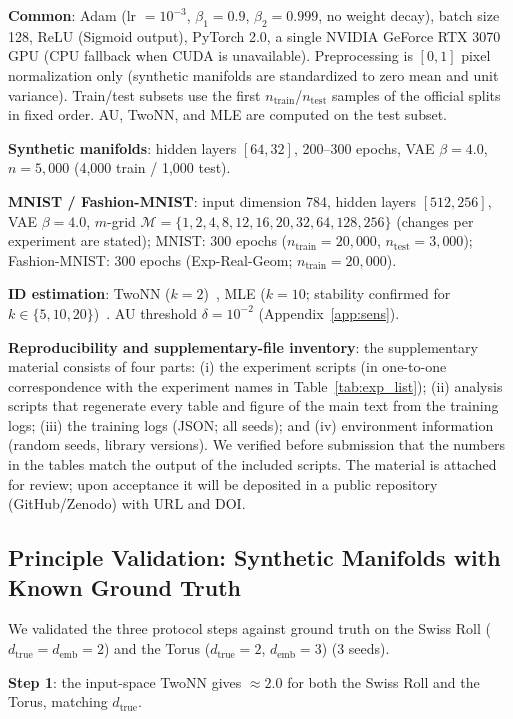\documentclass[make,article,submit,pdftex,moreauthors]{Definitions/mdpi}
\newcommand{\dtrue}{d_{\mathrm{true}}}
\newcommand{\demb}{d_{\mathrm{emb}}}
\begin{document}
\textbf{Common}: Adam (lr $= 10^{-3}$, $\beta_1 = 0.9$, $\beta_2 = 0.999$,
no weight decay), batch size 128, ReLU (Sigmoid output), PyTorch 2.0, a
single NVIDIA GeForce RTX 3070 GPU (CPU fallback when CUDA is unavailable).
Preprocessing is $[0,1]$ pixel normalization only (synthetic manifolds are
standardized to zero mean and unit variance).
Train/test subsets use the first $n_{\mathrm{train}}$/$n_{\mathrm{test}}$
samples of the official splits in fixed order.
AU, TwoNN, and MLE are computed on the test subset.

\textbf{Synthetic manifolds}: hidden layers $[64, 32]$, 200--300 epochs,
VAE $\beta = 4.0$, $n = 5{,}000$ (4{,}000 train / 1{,}000 test).

\textbf{MNIST / Fashion-MNIST}: input dimension 784, hidden layers
$[512, 256]$, VAE $\beta = 4.0$, $m$-grid
$\mathcal{M} = \{1, 2, 4, 8, 12, 16, 20, 32, 64, 128, 256\}$ (changes per
experiment are stated); MNIST: 300 epochs
($n_{\mathrm{train}} = 20{,}000$, $n_{\mathrm{test}} = 3{,}000$);
Fashion-MNIST: 300 epochs (Exp-Real-Geom; $n_{\mathrm{train}} = 20{,}000$).

\textbf{ID estimation}: TwoNN ($k = 2$)~\cite{facco2017twonn}, MLE
($k = 10$; stability confirmed for $k \in \{5, 10, 20\}$)~\cite{levina2005mle}.
AU threshold $\delta = 10^{-2}$ (Appendix~\ref{app:sens}).

\textbf{Reproducibility and supplementary-file inventory}:
the supplementary material consists of four parts:
(i) the experiment scripts (in one-to-one correspondence with the experiment
names in Table~\ref{tab:exp_list});
(ii) analysis scripts that regenerate every table and figure of the main
text from the training logs;
(iii) the training logs (JSON; all seeds); and
(iv) environment information (random seeds, library versions).
We verified before submission that the numbers in the tables match the
output of the included scripts.
The material is attached for review; upon acceptance it will be deposited in
a public repository (GitHub/Zenodo) with URL and DOI.

\subsection{Principle Validation: Synthetic Manifolds with Known Ground Truth}\label{sec:exp_syn}

We validated the three protocol steps against ground truth on the Swiss Roll
($\dtrue = \demb = 2$) and the Torus ($\dtrue = 2$, $\demb = 3$)
(3 seeds).

\textbf{Step 1}: the input-space TwoNN gives $\approx 2.0$ for both the
Swiss Roll and the Torus, matching $\dtrue$.
\end{document}
